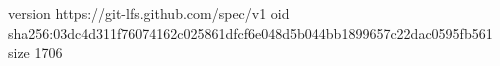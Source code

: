 version https://git-lfs.github.com/spec/v1
oid sha256:03dc4d311f76074162c025861dfcf6e048d5b044bb1899657c22dac0595fb561
size 1706
